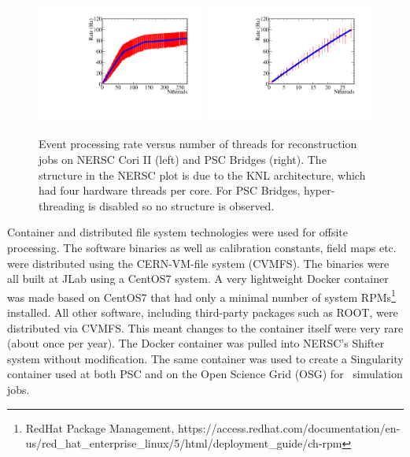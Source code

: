 \begin{figure}[h!]\centering
\includegraphics[width=0.49\textwidth]{figures/production_offsite_rate_vs_nthreads_NERSC.pdf}
\includegraphics[width=0.49\textwidth]{figures/production_offsite_rate_vs_nthreads_PSC.pdf}
\caption[]{\label{fig:production_offsite_rate_vs_nthreads_NERSC}Event processing rate versus number of threads for reconstruction jobs on NERSC Cori II (left) and PSC Bridges (right). The structure in the NERSC plot is due to the KNL architecture, which had four hardware threads per core. For PSC Bridges, hyper-threading is disabled so no structure is observed.} 
\end{figure}

Container and distributed file system technologies were used for offsite processing. The software binaries as well as calibration constants, field maps etc. were distributed using the CERN-VM-file system (CVMFS). 
The binaries were all built at JLab using a CentOS7 system. A very lightweight Docker container was made based on CentOS7 that had only a minimal number of system RPMs\footnote{RedHat Package Management, https://access.redhat.com/documentation/en-us/red\_hat\_enterprise\_linux/5/html/deployment\_guide/ch-rpm} installed. All other software, including third-party packages such as ROOT, were distributed via CVMFS. This meant changes to the container itself were very rare (about once per year). The Docker container was pulled into NERSC's Shifter system without modification. The same container was used to create a Singularity container used at both PSC and on the Open Science Grid (OSG) for \GX~simulation jobs.


